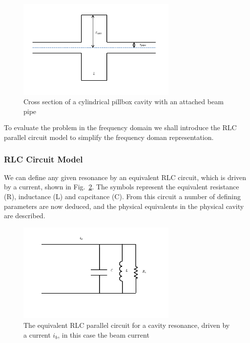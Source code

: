 \begin{figure}
\begin{center}
\includegraphics[width=0.7\textwidth]{Wakefields_and_Impedances/figures/pillbox-cav.pdf}
\end{center}
\caption{Cross section of a cylindrical pillbox cavity with an attached beam pipe}
\label{fig:cylin_geo_diagram}
\end{figure}

To evaluate the problem in the frequency domain we shall introduce the RLC parallel circuit model to simplify the frequency doman representation.

\subsubsection{RLC Circuit Model}

We can define any given resonance by an equivalent RLC circuit, which is driven by a current, shown in Fig.~\ref{fig:rlc_circ}. The symbols represent the equivalent resistance (R), inductance (L) and capcitance (C). From this circuit a number of defining parameters are now deduced, and the physical equivalents in the physical cavity are described.

\begin{figure}
\begin{center}
\includegraphics[width=0.7\textwidth]{Wakefields_and_Impedances/figures/equiv-circuit.pdf}
\end{center}
\caption{The equivalent RLC parallel circuit for a cavity resonance, driven by a current $i_{b}$, in this case the beam current}
\label{fig:rlc_circ}
\end{figure}


